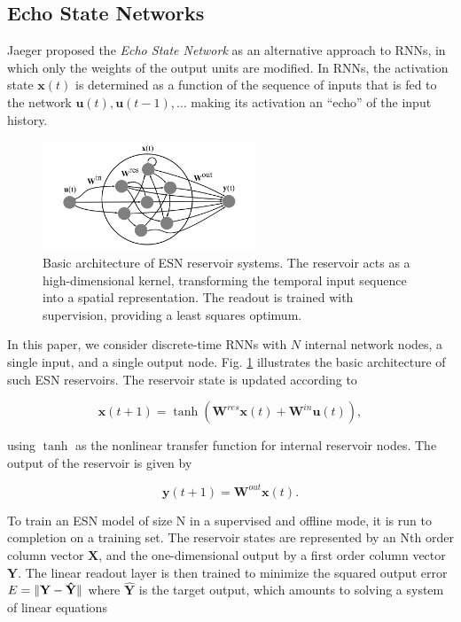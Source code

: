 \subsection{Echo State Networks}

Jaeger proposed the \textit{Echo State Network} \cite{jaeger_echo_2001} as an
alternative approach to RNNs, in which only the weights of the output units are
modified. In RNNs, the activation state $\mathbf{x}(t)$ is determined as a
function of the sequence of inputs that is fed to the network $\mathbf{u}(t),
\mathbf{u}(t-1), \ldots$ making its activation an ``echo'' of the input history.


\begin{figure}[H]
  \centering
  \includegraphics[width=2.5in]{img/esn.png}
  \caption{
    Basic architecture of ESN reservoir systems. The reservoir acts as a
high-dimensional kernel, transforming the temporal input sequence into a spatial
representation. The readout is trained with supervision, providing a least
squares optimum.
  }
  \label{esn}
\end{figure}

In this paper, we consider discrete-time RNNs with $N$ internal network nodes, a
single input, and a single output node. Fig. \ref{esn} illustrates the basic
architecture of such ESN reservoirs. The reservoir state is updated according to

\begin{equation}
  \mathbf{x}(t + 1) =
    \tanh(\mathbf{W}^{res}\mathbf{x}(t)
        + \mathbf{W}^{in}\mathbf{u}(t)),
  \label{xt}
\end{equation}

\noindent using $\tanh$ as the nonlinear transfer function for internal
reservoir nodes. The output of the reservoir is given by

\begin{equation}
  \mathbf{y}(t + 1) =
    \mathbf{W}^{out}\mathbf{x}(t).
  \label{yt}
\end{equation}

To train an ESN model of size N in a supervised and offline mode, it is run to
completion on a training set. The reservoir states are represented by an Nth
order column vector $\mathbf{X}$, and the one-dimensional output by a first
order column vector $\mathbf{Y}$. The linear readout layer is then trained to
minimize the squared output error $E = \Vert \mathbf{Y} - \mathbf{\hat{Y}} \Vert$
where $\mathbf{\hat{Y}}$ is the target output, which amounts to solving a system
of linear equations

